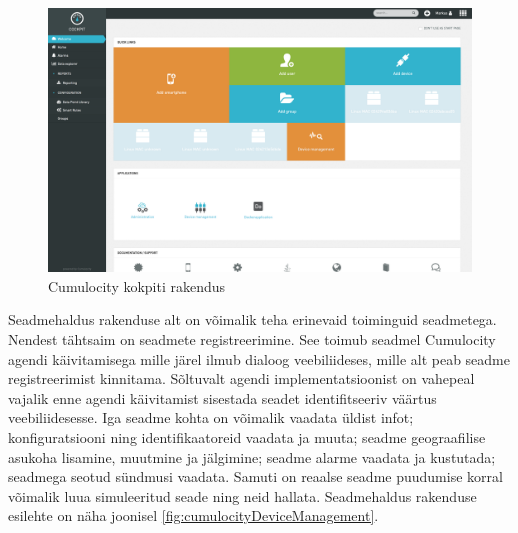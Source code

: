 \documentclass[12pt]{article}
\begin{document}
  \begin{figure} [ht] %
  \begin{center}
  \includegraphics[width=1\textwidth]{cumulocityCockpit}
  \caption{Cumulocity kokpiti rakendus}
  \label{fig:cumulocityCockpit}
  \end{center}
  \end{figure}
  
  \FloatBarrier

  Seadmehaldus rakenduse alt on võimalik teha erinevaid toiminguid seadmetega. Nendest
  tähtsaim on seadmete registreerimine. See toimub seadmel Cumulocity agendi käivitamisega
  mille järel ilmub dialoog veebiliideses, mille alt peab seadme registreerimist kinnitama.
  Sõltuvalt agendi implementatsioonist on vahepeal vajalik enne agendi käivitamist sisestada
  seadet identifitseeriv väärtus veebiliidesesse. Iga seadme kohta on võimalik
  vaadata üldist infot; konfiguratsiooni ning identifikaatoreid
  vaadata ja muuta; seadme geograafilise asukoha lisamine, muutmine ja jälgimine;
  seadme alarme vaadata ja kustutada; seadmega seotud sündmusi vaadata. Samuti on
  reaalse seadme puudumise korral võimalik luua simuleeritud seade ning neid hallata.
  Seadmehaldus rakenduse esilehte on näha joonisel \ref{fig:cumulocityDeviceManagement}.
\end{document}
